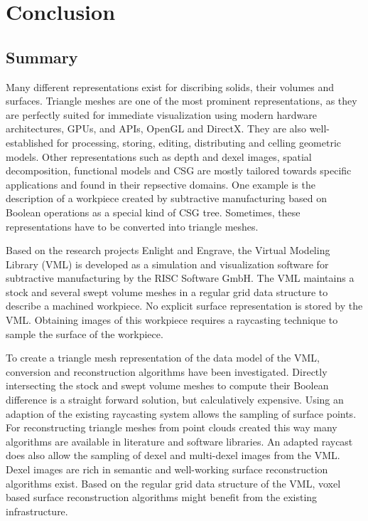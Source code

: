 \chapter{Conclusion}
\label{ch:conclusion}

\section{Summary}
\label{sec:summary}

Many different representations exist for discribing solids, their volumes and surfaces.
Triangle meshes are one of the most prominent representations, as they are perfectly suited for immediate visualization using modern hardware architectures, \ie GPUs, and APIs, \eg OpenGL and DirectX.
They are also well-established for processing, storing, editing, distributing and celling geometric models.
Other representations such as depth and dexel images, spatial decomposition, functional models and CSG are mostly tailored towards specific applications and found in their repsective domains.
One example is the description of a workpiece created by subtractive manufacturing based on Boolean operations as a special kind of CSG tree.
Sometimes, these representations have to be converted into triangle meshes.

Based on the research projects Enlight and Engrave, the Virtual Modeling Library (VML) is developed as a simulation and visualization software for subtractive manufacturing by the RISC Software GmbH.
The VML maintains a stock and several swept volume meshes in a regular grid data structure to describe a machined workpiece.
No explicit surface representation is stored by the VML.
Obtaining images of this workpiece requires a raycasting technique to sample the surface of the workpiece.

To create a triangle mesh representation of the data model of the VML, conversion and reconstruction algorithms have been investigated.
%
Directly intersecting the stock and swept volume meshes to compute their Boolean difference is a straight forward solution, but calculatively expensive.
%
Using an adaption of the existing raycasting system allows the sampling of surface points.
For reconstructing triangle meshes from point clouds created this way many algorithms are available in literature and software libraries.
%
An adapted raycast does also allow the sampling of dexel and multi-dexel images from the VML.
Dexel images are rich in semantic and well-working surface reconstruction algorithms exist.
%
Based on the regular grid data structure of the VML, voxel based surface reconstruction algorithms might benefit from the existing infrastructure.

